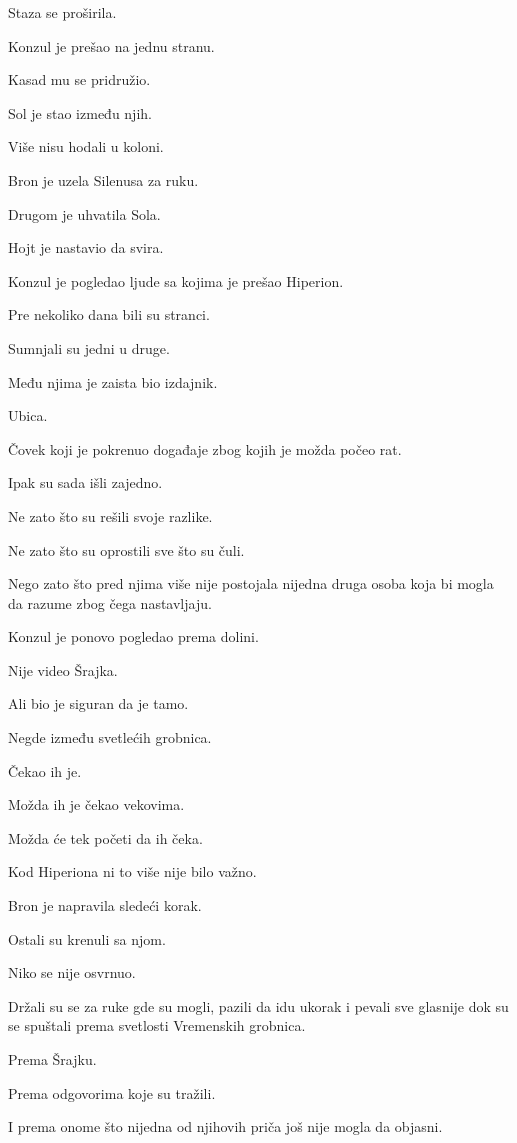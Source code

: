\bigskip

Staza se proširila.

Konzul je prešao na jednu stranu.

Kasad mu se pridružio.

Sol je stao između njih.

Više nisu hodali u koloni.

Bron je uzela Silenusa za ruku.

Drugom je uhvatila Sola.

Hojt je nastavio da svira.

Konzul je pogledao ljude sa kojima je prešao Hiperion.

Pre nekoliko dana bili su stranci.

Sumnjali su jedni u druge.

Među njima je zaista bio izdajnik.

Ubica.

Čovek koji je pokrenuo događaje zbog kojih je možda počeo rat.

Ipak su sada išli zajedno.

Ne zato što su rešili svoje razlike.

Ne zato što su oprostili sve što su čuli.

Nego zato što pred njima više nije postojala nijedna druga osoba koja bi mogla da razume zbog čega nastavljaju.

Konzul je ponovo pogledao prema dolini.

Nije video Šrajka.

Ali bio je siguran da je tamo.

Negde između svetlećih grobnica.

Čekao ih je.

Možda ih je čekao vekovima.

Možda će tek početi da ih čeka.

Kod Hiperiona ni to više nije bilo važno.

Bron je napravila sledeći korak.

Ostali su krenuli sa njom.

Niko se nije osvrnuo.

Držali su se za ruke gde su mogli, pazili da idu ukorak i pevali sve glasnije dok su se spuštali prema svetlosti Vremenskih grobnica.

Prema Šrajku.

Prema odgovorima koje su tražili.

I prema onome što nijedna od njihovih priča još nije mogla da objasni.
